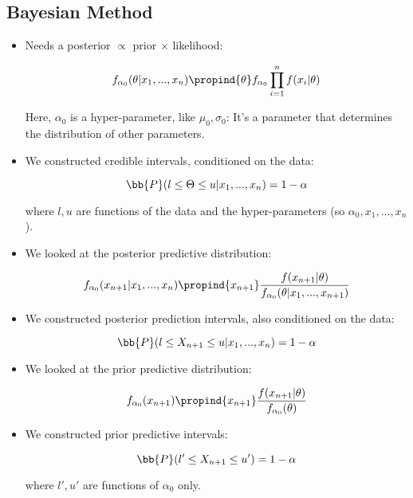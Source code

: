 \documentclass[a4paper]{article}
\begin{document}
        \subsection*{Bayesian Method}
            \begin{itemize}
                \item Needs a posterior $\propto$ prior $\times$ likelihood:

                    $$
                        f_{\alpha_0}(\theta | x_1, ..., x_n) \propind{\theta}
                        f_{\alpha_0} \prod_{i=1}^n f(x_i | \theta)
                    $$

                    Here, $\alpha_0$ is a hyper-parameter, like $\mu_0,
                    \sigma_0$: It's a parameter that determines the distribution
                    of other parameters.

                \item We constructed credible intervals, conditioned on the
                    data:

                    $$
                        \bb{P}(l \leq \Theta \leq u | x_1, ..., x_n) = 1 -
                        \alpha
                    $$

                    where $l, u$ are functions of the data and the
                    hyper-parameters (so $\alpha_0, x_1, ..., x_n$).

                \item We looked at the posterior predictive distribution:

                    $$
                        f_{\alpha_0}(x_{n+1} | x_1, ..., x_n) \propind{x_{n+1}}
                        \frac{f(x_{n+1}| \theta)}{f_{\alpha_0}(\theta | x_1,
                        ..., x_{n+1})}
                    $$

                \item We constructed posterior prediction intervals, also
                    conditioned on the data:

                    $$
                        \bb{P}(l \leq X_{n+1} \leq u | x_1, ..., x_n) = 1 -
                        \alpha
                    $$

                \item We looked at the prior predictive distribution:

                    $$
                        f_{\alpha_0}(x_{n+1}) \propind{x_{n+1}} \frac{f(x_{n+1}
                        | \theta)}{f_{\alpha_0}(\theta)}
                    $$

                \item We constructed prior predictive intervals:

                    $$
                        \bb{P}(l' \leq X_{n+1} \leq u') = 1 - \alpha
                    $$

                    where $l', u'$ are functions of $\alpha_0$ only.
            \end{itemize}
\end{document}
